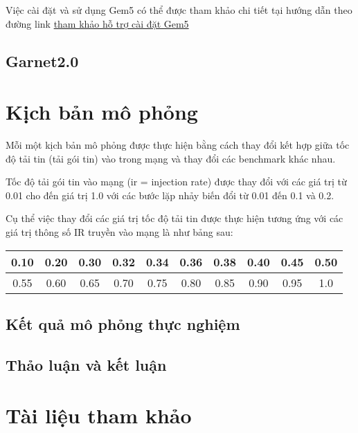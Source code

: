 \documentclass{article}
\begin{document}
Việc cài đặt và sử dụng Gem5 có thể được tham khảo chi tiết tại hướng dẫn theo đường link \href{http://learning.gem5.org/book/part1/building.html}{tham khảo hỗ trợ cài đặt Gem5}
\subsection{Garnet2.0}


\section{Kịch bản mô phỏng}

Mỗi một kịch bản mô phỏng được thực hiện bằng cách thay đổi kết hợp giữa tốc độ tải tin (tải gói tin) vào trong mạng và thay đổi các benchmark khác nhau. 

Tốc độ tải gói tin vào mạng (ir = injection rate) được thay đổi với các giá trị từ 0.01 cho đến giá trị 1.0 với các bước lặp nhảy biến đổi từ 0.01 đến 0.1 và 0.2.

Cụ thể việc thay đổi các giá trị tốc độ tải tin được thực hiện tương ứng với các giá trị thông số IR truyền vào mạng là như bảng sau:

\begin{center}
\begin{tabular}{|c|c|c|c|c|c|c|c|c|c|}
	\hline
	0.10 & 0.20  &0.30  &0.32  &0.34  &0.36  &0.38  &0.40  &0.45  &0.50  \\ 
	\hline
	0.55 & 0.60  &0.65  &0.70  &0.75  &0.80  &0.85  &0.90  &0.95  &1.0 \\
	\hline
\end{tabular} 
\end{center}
\subsection{Kết quả mô phỏng thực nghiệm}
\subsection{Thảo luận và kết luận}

\section{Tài liệu tham khảo}


	\newpage
	
	
	
\end{document}
